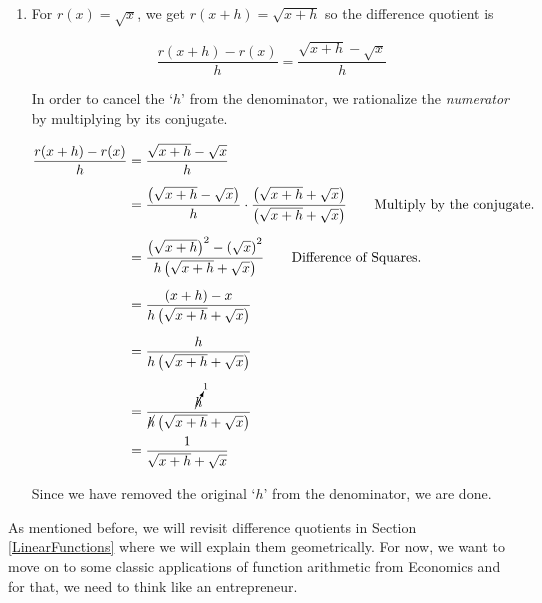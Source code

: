 {\begin{enumerate}
Since we have managed to cancel the original `$h$' from the denominator, we are done.

\item  For $r(x) = \sqrt{x}$, we get $r(x+h) = \sqrt{x+h}$ so the difference quotient is 

\[ \dfrac{r(x+h) - r(x)}{h} = \dfrac{\sqrt{x+h} - \sqrt{x}}{h} \]

In order to cancel the `$h$' from the denominator, we rationalize the \textit{numerator} by multiplying by its conjugate.

\noindent\hskip-30pt\begin{minipage}{\textwidth+20pt}
\begin{align*}
\dfrac{r(x+h) - r(x)}{h} & = \dfrac{\sqrt{x+h} - \sqrt{x}}{h}  \\[5pt] 											 & =  \dfrac{\left(\sqrt{x+h} - \sqrt{x}\right)}{h} \cdot \dfrac{\left(\sqrt{x+h} + \sqrt{x}\right)}{\left(\sqrt{x+h} + \sqrt{x}\right)}  \tag*{Multiply by the conjugate.} \\[5pt]
	 & =   \dfrac{\left(\sqrt{x+h}\right)^2 - \left(\sqrt{x}\right)^2}{h\left(\sqrt{x+h} + \sqrt{x}\right)}  \tag*{Difference of Squares.}\\[5pt]					& =   \dfrac{(x+h) - x}{h\left(\sqrt{x+h} + \sqrt{x}\right)}  \\[5pt]
	  				    & =   \dfrac{h}{h\left(\sqrt{x+h} + \sqrt{x}\right)}  \\[5pt]
	  				    & =   \dfrac{\cancelto{1}{h}}{\cancel{h}\left(\sqrt{x+h} + \sqrt{x}\right)} \\ 
	 & =   \dfrac{1}{\sqrt{x+h} + \sqrt{x}}
\end{align*}
\end{minipage}

\enlargethispage{2\baselineskip}

Since we have removed the original `$h$' from the denominator, we are done.
\end{enumerate}
}
\pagebreak

\label{diffquotgeompromise}

As mentioned before, we will revisit difference quotients in Section \ref{LinearFunctions} where we will explain them geometrically.  For now, we want to move on to some classic applications of function arithmetic from Economics and for that, we need to think like an entrepreneur.

\medskip

